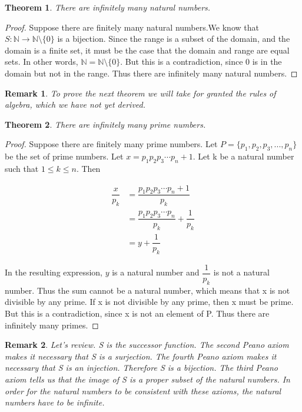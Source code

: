 \documentclass{article}
\newtheorem{theorem}{Theorem}
\newtheorem{remark}{Remark}
\begin{document}
\begin{theorem}
There are infinitely many natural numbers. 
\end{theorem}

\begin{proof}
Suppose there are finitely many natural numbers.We know that $S : \mathbb{N} \to \mathbb{N}\setminus\{0\}$ is a bijection. Since the range is a subset of the domain, and the domain is a finite set, it must be the case that the domain and range are equal sets. In other words, $\mathbb{N} = \mathbb{N}\setminus\{0\}$. But this is a contradiction, since 0 is in the domain but not in the range. Thus there are infinitely many natural numbers. 
\end{proof}

\begin{remark}
To prove the next theorem we will take for granted the rules of algebra, which we have not yet derived.
\end{remark}

\begin{theorem}
There are infinitely many prime numbers.
\end{theorem}

\begin{proof}
Suppose there are finitely many prime numbers. Let $P = \{p_{1}, p_{2}, p_{3}, ... ,p_{n}\}$ be the set of prime numbers. Let $x = p_{1}p_{2}p_{3} \dotsm p_{n} + 1$. Let k be a natural number such that $1 \leq k \leq n$. Then 

\begin{align*}
\dfrac{x}{p_{k}} &= \dfrac{p_{1}p_{2}p_{3} \dotsm p_{n} + 1}{p_{k}} \\
&= \dfrac{p_{1}p_{2}p_{3} \dotsm p_{n}}{p_{k}} + \dfrac{1}{p_{k}} \\
&= y + \dfrac{1}{p_{k}}
\end{align*}

In the resulting expression, $y$ is a natural number and $\dfrac{1}{p_{k}}$ is not a natural number. Thus the sum cannot be a natural number, which means that x is not divisible by any prime. If x is not divisible by any prime, then x must be prime. But this is a contradiction, since x is not an element of P. Thus there are infinitely many primes. 
\end{proof}

\begin{remark}
Let's review. S is the successor function. The second Peano axiom makes it necessary that S is a surjection. The fourth Peano axiom makes it necessary that S is an injection. Therefore S is a bijection. The third Peano axiom tells us that the image of S is a proper subset of the natural numbers. In order for the natural numbers to be consistent with these axioms, the natural numbers have to be infinite.
\end{remark}
\end{document}
